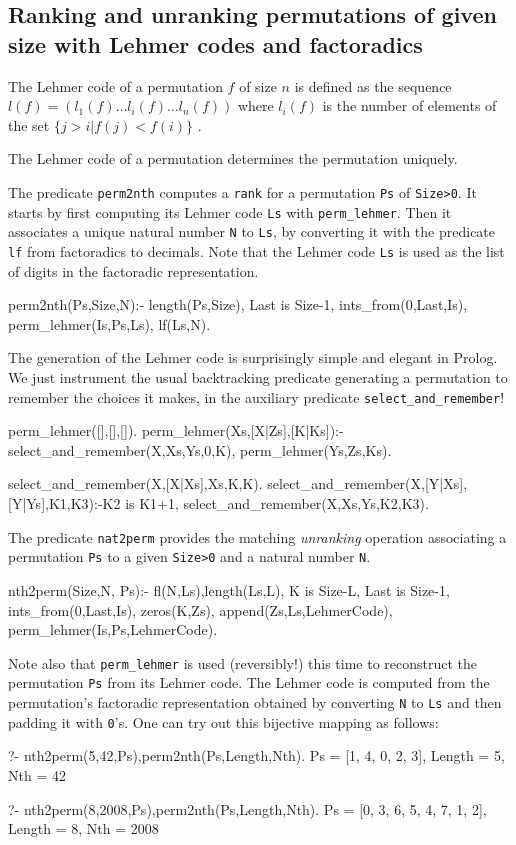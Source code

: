 \documentclass[]{INCLUDES/llncs}
\begin{document}
\subsection{Ranking and unranking permutations of given size with Lehmer codes
and factoradics} 
The Lehmer code of a permutation $f$ of size $n$ is defined as the sequence
$l(f)=(l_1(f) \ldots l_i(f) \ldots l_n(f))$ 
where $l_i(f)$ is the number
of elements of the set $\{j>i|f(j)<f(i)\}$
\cite{DBLP:journals/dmtcs/MantaciR01}.
 \begin{prop}
 The Lehmer code of a permutation determines the permutation uniquely.
 \end{prop} 
The predicate {\tt perm2nth} computes a {\tt rank} 
for a permutation {\tt Ps} of {\tt Size>0}. 
It starts by first computing its Lehmer code {\tt Ls} with 
{\tt perm\_lehmer}. Then  it associates a unique natural 
number {\tt N} to {\tt Ls}, 
by converting it with the predicate {\tt lf} 
from factoradics to decimals. 
Note that the Lehmer code {\tt Ls} is used as the list of digits
in the factoradic representation.
\begin{code}
perm2nth(Ps,Size,N):-
  length(Ps,Size),
  Last is Size-1,
  ints_from(0,Last,Is),
  perm_lehmer(Is,Ps,Ls),
  lf(Ls,N).
\end{code}
The generation of the Lehmer code is surprisingly
simple and elegant in Prolog. We just instrument the
usual backtracking predicate generating a permutation
to remember the choices it makes, 
in the auxiliary predicate {\tt select\_and\_remember}!
\begin{code}
perm_lehmer([],[],[]).
perm_lehmer(Xs,[X|Zs],[K|Ks]):-
  select_and_remember(X,Xs,Ys,0,K),
  perm_lehmer(Ys,Zs,Ks).

select_and_remember(X,[X|Xs],Xs,K,K).
select_and_remember(X,[Y|Xs],[Y|Ys],K1,K3):-K2 is K1+1,
  select_and_remember(X,Xs,Ys,K2,K3).
\end{code}  

The predicate {\tt nat2perm} provides the matching {\em unranking}
operation associating a permutation {\tt Ps} to a given {\tt Size>0} 
and a natural number {\tt N}.
\begin{code}
nth2perm(Size,N, Ps):-
  fl(N,Ls),length(Ls,L),
  K is Size-L,
  Last is Size-1,
  ints_from(0,Last,Is),
  zeros(K,Zs),
  append(Zs,Ls,LehmerCode),
  perm_lehmer(Is,Ps,LehmerCode).
\end{code}
Note also that {\tt perm\_lehmer} is used (reversibly!) this time
to reconstruct the permutation {\tt Ps} from its Lehmer code.
The Lehmer code is computed from the permutation's 
factoradic representation obtained by converting {\tt N} to {\tt Ls} 
and then padding it with {\tt 0}'s.
One can try out this bijective mapping as follows:
\begin{codex}
?- nth2perm(5,42,Ps),perm2nth(Ps,Length,Nth).
Ps = [1, 4, 0, 2, 3],
Length = 5,
Nth = 42

?- nth2perm(8,2008,Ps),perm2nth(Ps,Length,Nth).
Ps = [0, 3, 6, 5, 4, 7, 1, 2],
Length = 8,
Nth = 2008
\end{codex}
\end{document}
